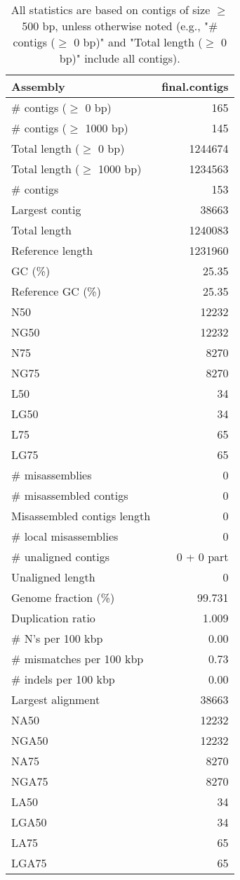 \documentclass[12pt,a4paper]{article}
\begin{document}
\begin{table}[ht]
\begin{center}
\caption{All statistics are based on contigs of size $\geq$ 500 bp, unless otherwise noted (e.g., "\# contigs ($\geq$ 0 bp)" and "Total length ($\geq$ 0 bp)" include all contigs).}
\begin{tabular}{|l*{1}{|r}|}
\hline
Assembly & final.contigs \\ \hline
\# contigs ($\geq$ 0 bp) & 165 \\ \hline
\# contigs ($\geq$ 1000 bp) & 145 \\ \hline
Total length ($\geq$ 0 bp) & 1244674 \\ \hline
Total length ($\geq$ 1000 bp) & 1234563 \\ \hline
\# contigs & 153 \\ \hline
Largest contig & 38663 \\ \hline
Total length & 1240083 \\ \hline
Reference length & 1231960 \\ \hline
GC (\%) & 25.35 \\ \hline
Reference GC (\%) & 25.35 \\ \hline
N50 & 12232 \\ \hline
NG50 & 12232 \\ \hline
N75 & 8270 \\ \hline
NG75 & 8270 \\ \hline
L50 & 34 \\ \hline
LG50 & 34 \\ \hline
L75 & 65 \\ \hline
LG75 & 65 \\ \hline
\# misassemblies & 0 \\ \hline
\# misassembled contigs & 0 \\ \hline
Misassembled contigs length & 0 \\ \hline
\# local misassemblies & 0 \\ \hline
\# unaligned contigs & 0 + 0 part \\ \hline
Unaligned length & 0 \\ \hline
Genome fraction (\%) & 99.731 \\ \hline
Duplication ratio & 1.009 \\ \hline
\# N's per 100 kbp & 0.00 \\ \hline
\# mismatches per 100 kbp & 0.73 \\ \hline
\# indels per 100 kbp & 0.00 \\ \hline
Largest alignment & 38663 \\ \hline
NA50 & 12232 \\ \hline
NGA50 & 12232 \\ \hline
NA75 & 8270 \\ \hline
NGA75 & 8270 \\ \hline
LA50 & 34 \\ \hline
LGA50 & 34 \\ \hline
LA75 & 65 \\ \hline
LGA75 & 65 \\ \hline
\end{tabular}
\end{center}
\end{table}
\end{document}

